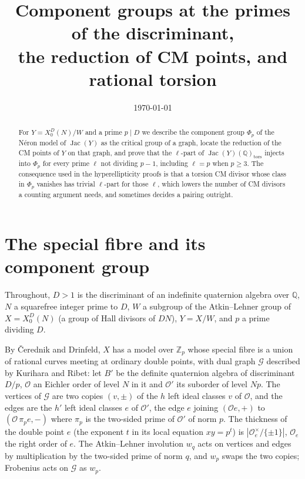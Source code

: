 \documentclass[11pt,reqno]{amsart}
\theoremstyle{plain}
\theoremstyle{definition}
\DeclareMathOperator{\Jac}{Jac}
\newcommand{\Q}{\mathbb{Q}}
\newcommand{\Z}{\mathbb{Z}}
\begin{document}
\title{Component groups at the primes of the discriminant,\\ the reduction of CM points, and rational torsion}
\author{}
\date{\today}
\maketitle

\begin{abstract}
For $Y=X_0^D(N)/W$ and a prime $p\mid D$ we describe the component group $\Phi_p$ of the N\'eron model of
$\Jac(Y)$ as the critical group of a graph, locate the reduction of the CM points of $Y$ on that graph, and
prove that the $\ell$-part of $\Jac(Y)(\Q)_{\mathrm{tors}}$ injects into $\Phi_p$ for every prime $\ell$ not
dividing $p-1$, including $\ell=p$ when $p\ge3$. The consequence used in the hyperellipticity proofs is that
a torsion CM divisor whose class in $\Phi_p$ vanishes has trivial $\ell$-part for those $\ell$, which lowers
the number of CM divisors a counting argument needs, and sometimes decides a pairing outright.
\end{abstract}

\section{The special fibre and its component group}\label{sec:fibre}

Throughout, $D>1$ is the discriminant of an indefinite quaternion algebra over $\Q$, $N$ a squarefree integer
prime to $D$, $W$ a subgroup of the Atkin--Lehner group of $X=X_0^D(N)$ (a group of Hall divisors of $DN$),
$Y=X/W$, and $p$ a prime dividing $D$.

By \v{C}erednik and Drinfeld, $X$ has a model over $\Z_p$ whose special fibre is a union of rational curves
meeting at ordinary double points, with dual graph $\mathcal G$ described by Kurihara and Ribet: let $B'$ be the
definite quaternion algebra of discriminant $D/p$, $\mathcal O$ an Eichler order of level $N$ in it and
$\mathcal O'$ its suborder of level $Np$. The vertices of $\mathcal G$ are two copies $(v,\pm)$ of the $h$ left
ideal classes $v$ of $\mathcal O$, and the edges are the $h'$ left ideal classes $e$ of $\mathcal O'$, the edge
$e$ joining $(\mathcal O e,+)$ to $(\mathcal O\,\pi_pe,-)$ where $\pi_p$ is the two-sided prime of $\mathcal O'$
of norm $p$. The thickness of the double point $e$ (the exponent $t$ in its local equation $xy=p^t$) is
$|\mathcal O_e^\times/\{\pm1\}|$, $\mathcal O_e$ the right order of $e$. The Atkin--Lehner involution $w_q$
acts on vertices and edges by multiplication by the two-sided prime of norm $q$, and $w_p$ swaps the two
copies; Frobenius acts on $\mathcal G$ as $w_p$.
\end{document}
